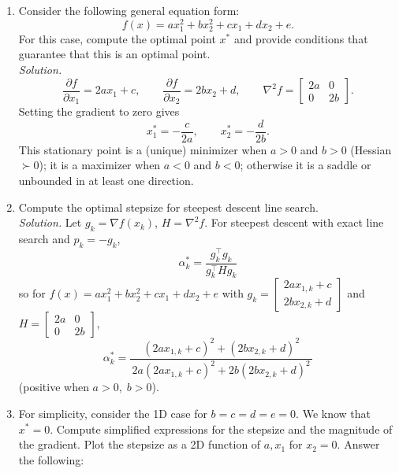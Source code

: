\documentclass[11pt]{article}
\begin{document}
	\begin{enumerate}[label=\textbf{1(\alph*)}]
		\item Consider the following general equation form:
		\[
		f(x) = a x_1^2 + b x_2^2 + c x_1 + d x_2 + e.
		\]
		For this case, compute the optimal point $x^{\ast}$ and provide conditions that guarantee that this is an optimal point.\\[0.25em]
		\textit{Solution.}
		\[
		\frac{\partial f}{\partial x_1}=2a x_1 + c,\qquad
		\frac{\partial f}{\partial x_2}=2b x_2 + d,\qquad
		\nabla^2 f=\begin{bmatrix}2a&0\\[2pt]0&2b\end{bmatrix}.
		\]
		Setting the gradient to zero gives
		\[
		x_1^\ast=-\frac{c}{2a},\qquad x_2^\ast=-\frac{d}{2b}.
		\]
		This stationary point is a (unique) minimizer when \(a>0\) and \(b>0\) (Hessian \(\succ 0\)); 
		it is a maximizer when \(a<0\) and \(b<0\); otherwise it is a saddle or unbounded in at least one direction.
		
		\item Compute the optimal stepsize for steepest descent line search.\\[0.25em]
		\textit{Solution.}
		Let $g_k=\nabla f(x_k)$, $H=\nabla^2 f$. For steepest descent with exact line search and $p_k=-g_k$,
		\[
		\boxed{\;\alpha_k^\ast=\frac{g_k^\top g_k}{g_k^\top H g_k}\;}
		\]
		so for $f(x)=a x_1^2+b x_2^2+c x_1+d x_2+e$ with $g_k=\begin{bmatrix}2a x_{1,k}+c\\[2pt]2b x_{2,k}+d\end{bmatrix}$ and
		$H=\begin{bmatrix}2a&0\\[2pt]0&2b\end{bmatrix}$,
		\[
		\boxed{\;\alpha_k^\ast=
			\frac{(2a x_{1,k}+c)^2+(2b x_{2,k}+d)^2}{\,2a(2a x_{1,k}+c)^2+2b(2b x_{2,k}+d)^2\,}\;}
		\]
		(positive when $a>0,\;b>0$).
		
		\newpage
		\item For simplicity, consider the 1D case for $b = c = d = e = 0$. We know that $x^{\ast} = 0$. Compute simplified expressions for the stepsize and the magnitude of the gradient. Plot the stepsize as a 2D function of $a, x_1$ for $x_2 = 0$. Answer the following:
		

\end{enumerate}
\end{document}
